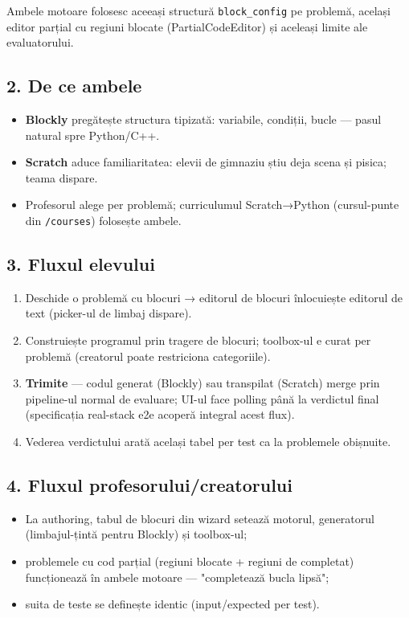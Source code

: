 \documentclass[
]{article}
\providecommand{\tightlist}{%
  \setlength{\itemsep}{0pt}\setlength{\parskip}{0pt}}
\begin{document}
Ambele motoare folosesc aceeași structură \texttt{block\_config} pe
problemă, același editor parțial cu regiuni blocate (PartialCodeEditor)
și aceleași limite ale evaluatorului.

\subsection{2. De ce ambele}\label{2-de-ce-ambele}

\begin{itemize}
\tightlist
\item
  \textbf{Blockly} pregătește structura tipizată: variabile, condiții,
  bucle --- pasul natural spre Python/C++.
\item
  \textbf{Scratch} aduce familiaritatea: elevii de gimnaziu știu deja
  scena și pisica; teama dispare.
\item
  Profesorul alege per problemă; curriculumul Scratch→Python
  (cursul-punte din \texttt{/courses}) folosește ambele.
\end{itemize}

\subsection{3. Fluxul elevului}\label{3-fluxul-elevului}

\begin{enumerate}
\def\labelenumi{\arabic{enumi}.}
\tightlist
\item
  Deschide o problemă cu blocuri → editorul de blocuri înlocuiește
  editorul de text (picker-ul de limbaj dispare).
\item
  Construiește programul prin tragere de blocuri; toolbox-ul e curat per
  problemă (creatorul poate restriciona categoriile).
\item
  \textbf{Trimite} --- codul generat (Blockly) sau transpilat (Scratch)
  merge prin pipeline-ul normal de evaluare; UI-ul face polling până la
  verdictul final (specificația real-stack e2e acoperă integral acest
  flux).
\item
  Vederea verdictului arată același tabel per test ca la problemele
  obișnuite.
\end{enumerate}

\subsection{4. Fluxul
profesorului/creatorului}\label{4-fluxul-profesoruluicreatorului}

\begin{itemize}
\tightlist
\item
  La authoring, tabul de blocuri din wizard setează motorul, generatorul
  (limbajul-țintă pentru Blockly) și toolbox-ul;
\item
  problemele cu cod parțial (regiuni blocate + regiuni de completat)
  funcționează în ambele motoare --- "completează bucla lipsă";
\item
  suita de teste se definește identic (input/expected per test).
\end{itemize}
\end{document}
